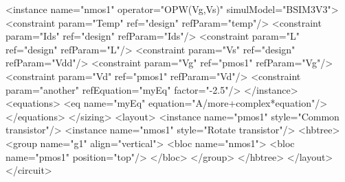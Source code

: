 \begin{DoxyCodeInclude}
    <instance name=\textcolor{stringliteral}{"nmos1"} \textcolor{keyword}{operator}=\textcolor{stringliteral}{"OPW(Vg,Vs)"} simulModel=\textcolor{stringliteral}{"BSIM3V3"}>
      <constraint param=\textcolor{stringliteral}{"Temp"} ref=\textcolor{stringliteral}{"design"} refParam=\textcolor{stringliteral}{"temp"}/>
      <constraint param=\textcolor{stringliteral}{"Ids"}  ref=\textcolor{stringliteral}{"design"} refParam=\textcolor{stringliteral}{"Ids"}/>
      <constraint param=\textcolor{stringliteral}{"L"}    ref=\textcolor{stringliteral}{"design"} refParam=\textcolor{stringliteral}{"L"}/>
      <constraint param=\textcolor{stringliteral}{"Vs"}   ref=\textcolor{stringliteral}{"design"} refParam=\textcolor{stringliteral}{"Vdd"}/>
      <constraint param=\textcolor{stringliteral}{"Vg"}   ref=\textcolor{stringliteral}{"pmos1"}  refParam=\textcolor{stringliteral}{"Vg"}/>
      <constraint param=\textcolor{stringliteral}{"Vd"}   ref=\textcolor{stringliteral}{"pmos1"}  refParam=\textcolor{stringliteral}{"Vd"}/>
      <constraint param=\textcolor{stringliteral}{"another"} refEquation=\textcolor{stringliteral}{"myEq"} factor=\textcolor{stringliteral}{"-2.5"}/>
    </instance>
    <equations>
      <eq name=\textcolor{stringliteral}{"myEq"} equation=\textcolor{stringliteral}{"A/more+complex*equation"}/>
    </equations>
  </sizing>
  <layout>
    <instance name=\textcolor{stringliteral}{"pmos1"} style=\textcolor{stringliteral}{"Common transistor"}/>
    <instance name=\textcolor{stringliteral}{"nmos1"} style=\textcolor{stringliteral}{"Rotate transistor"}/>
    <hbtree>
      <group name=\textcolor{stringliteral}{"g1"} align=\textcolor{stringliteral}{"vertical"}>
        <bloc name=\textcolor{stringliteral}{"nmos1"}>
          <bloc name=\textcolor{stringliteral}{"pmos1"} position=\textcolor{stringliteral}{"top"}/>
        </bloc>
      </group>
    </hbtree>
  </layout>
</circuit>
\end{DoxyCodeInclude}
 
